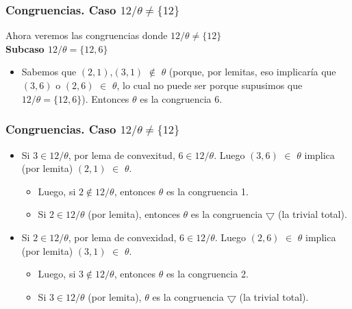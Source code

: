 \documentclass{beamer}
\begin{document}
\begin{frame}
\frametitle{Congruencias. Caso $12/\theta \not = \{12\}$}
Ahora veremos las congruencias donde $12/\theta \not = \{12\}$\\
\textbf{Subcaso $12/\theta = \{12,6\}$}
\begin{itemize}
\item Sabemos que $(2,1)$,$(3,1)$ $\notin$ $\theta$ (porque, por
    lemitas, eso implicaría que $(3,6)$ o $(2,6)$ $\in$ $\theta$, lo cual no puede
    ser porque supusimos que $12/\theta = \{12,6\}$). Entonces $\theta$ es la congruencia 6.\\
\end{itemize}    
\end{frame}

\begin{frame}
\frametitle{Congruencias. Caso $12/\theta \not = \{12\}$}
\begin{itemize}

\item Si $3 \in 12/\theta$, por lema de convexitud, $6 \in 12/\theta$. Luego $(3,6)$ $\in$ $\theta$ implica (por lemita) $(2,1)$ $\in$ $\theta$.
\begin{itemize}
\item Luego, si $2 \notin 12/\theta$, entonces $\theta$ es la congruencia 1. 

\item Si $2 \in 12/\theta$ (por lemita), entonces $\theta$ es la congruencia $\bigtriangledown$ (la trivial total).\\
\end{itemize}
    
\item Si $2 \in 12/\theta$, por lema de convexidad, $6 \in 12/\theta$. Luego $(2,6)$ $\in$ $\theta$ implica (por lemita) $(3,1)$ $\in$ $\theta$. 
\begin{itemize}
\item Luego, si $3 \notin 12/\theta$, entonces $\theta$ es la congruencia 2.
\item Si $3 \in 12/\theta$ (por lemita), $\theta$ es la congruencia $\bigtriangledown$ (la trivial total).\\
\end{itemize}
\end{itemize}

\end{frame}
\end{document}

